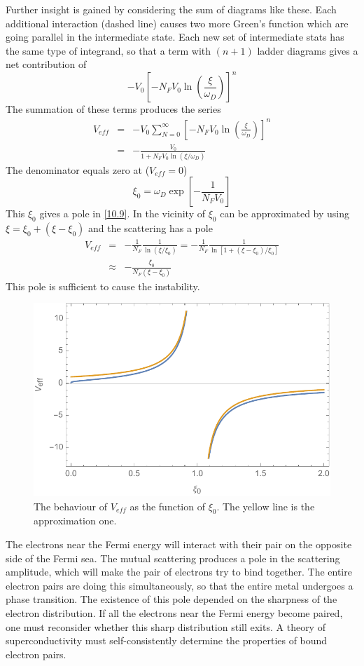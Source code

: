Further insight is gained by considering the sum of diagrams like these.
Each additional interaction (dashed line) causes two more Green's function which are going parallel in the intermediate state.
Each new set of intermediate stats has the same type of integrand, so that a term with $(n+1)$ ladder diagrams gives a net contribution of
\begin{equation}
    -V_0 \left[ -N_F V_0 \ln \left( \frac{\xi}{\omega_D} \right) \right]^n      \label{10.7}
\end{equation}
The summation of these terms produces the series
\begin{eqnarray}
    V_{eff} &=& -V_0 \sum_{N=0}^\infty \left[ -N_F V_0 \ln \left( \frac{\xi}{\omega_D} \right) \right]^n \nonumber \\
    &=& - \frac{V_0}{1+N_F V_0 \ln \left( \xi/\omega_D \right)}  \label{10.9}
\end{eqnarray}
The denominator equals zero at ($V_{eff}=0$)
\begin{equation}
    \xi_0 = \omega_D \exp \left[ - \frac{1}{N_F V_0} \right]    \label{10.10}
\end{equation}
This $\xi_0$ gives a pole in \eqref{10.9}.
In the vicinity of $\xi_0$ can be approximated by using $\xi = \xi_0 + \left( \xi - \xi_0 \right)$ and the scattering has a pole
\begin{eqnarray}
    V_{eff} &=& - \frac{1}{N_F} \frac{1}{\ln(\xi/\xi_0)} = - \frac{1}{N_F} \frac{1}{\ln \left[ 1 + (\xi-\xi_0)/\xi_0 \right]}   \nonumber \\
    &\approx&- \frac{\xi_0}{N_F(\xi- \xi_0)}     \label{10.11}
\end{eqnarray}
This pole is sufficient to cause the instability.
\begin{figure}[ht]
    \centering
    \includegraphics[width=0.55\linewidth]{./fig/fig_eq_10_11.pdf}
    \caption{The behaviour of $V_{eff}$ as the function of $\xi_0$. The yellow line is the approximation one.}%
    \label{fig:eq_10_1}
\end{figure}
The electrons near the Fermi energy will interact with their pair on the opposite side of the Fermi sea.
The mutual scattering produces a pole in the scattering amplitude, which will make the pair of electrons try to bind together.
The entire electron pairs are doing this simultaneously, so that the entire metal undergoes a phase transition.
The existence of this pole depended on the sharpness of the electron distribution.
If all the electrons near the Fermi energy become paired, one must reconsider whether this sharp distribution still exits.
A theory of superconductivity must self-consistently determine the properties of bound electron pairs.

